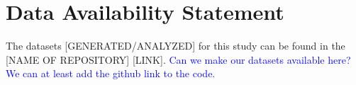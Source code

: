 \documentclass[utf8]{frontiersFPHY} %
\newcommand{\todo}[1]{\textcolor{blue}{#1}}
\begin{document}
\section*{Data Availability Statement}
The datasets [GENERATED/ANALYZED] for this study can be found in the [NAME OF REPOSITORY] [LINK]. 
\todo{Can we make our datasets available here? We can at least add the github link to the code.}






%
%

\end{document}
